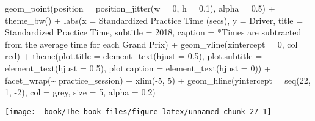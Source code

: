 \documentclass[
]{book}
\newenvironment{Shaded}{\begin{snugshade}}{\end{snugshade}}
\newcommand{\AttributeTok}[1]{\textcolor[rgb]{0.77,0.63,0.00}{#1}}
\newcommand{\DecValTok}[1]{\textcolor[rgb]{0.00,0.00,0.81}{#1}}
\newcommand{\FloatTok}[1]{\textcolor[rgb]{0.00,0.00,0.81}{#1}}
\newcommand{\FunctionTok}[1]{\textcolor[rgb]{0.00,0.00,0.00}{#1}}
\newcommand{\NormalTok}[1]{#1}
\newcommand{\SpecialCharTok}[1]{\textcolor[rgb]{0.00,0.00,0.00}{#1}}
\newcommand{\StringTok}[1]{\textcolor[rgb]{0.31,0.60,0.02}{#1}}
\begin{document}
\begin{Shaded}
\begin{Highlighting}[]
   \FunctionTok{geom\_point}\NormalTok{(}\AttributeTok{position =} \FunctionTok{position\_jitter}\NormalTok{(}\AttributeTok{w =} \DecValTok{0}\NormalTok{, }\AttributeTok{h =} \FloatTok{0.1}\NormalTok{), }\AttributeTok{alpha =} \FloatTok{0.5}\NormalTok{) }\SpecialCharTok{+}
   \FunctionTok{theme\_bw}\NormalTok{() }\SpecialCharTok{+}
   \FunctionTok{labs}\NormalTok{(}\AttributeTok{x =} \StringTok{\textquotesingle{}Standardized Practice Time (secs)\textquotesingle{}}\NormalTok{,}
        \AttributeTok{y =} \StringTok{\textquotesingle{}Driver\textquotesingle{}}\NormalTok{,}
        \AttributeTok{title =} \StringTok{\textquotesingle{}Standardized Practice Time\textquotesingle{}}\NormalTok{,}
        \AttributeTok{subtitle =} \StringTok{\textquotesingle{}2018\textquotesingle{}}\NormalTok{,}
        \AttributeTok{caption =} \StringTok{\textquotesingle{}*Times are subtracted from the average time for each Grand Prix\textquotesingle{}}\NormalTok{) }\SpecialCharTok{+}
   \FunctionTok{geom\_vline}\NormalTok{(}\AttributeTok{xintercept =} \DecValTok{0}\NormalTok{, }\AttributeTok{col =} \StringTok{\textquotesingle{}red\textquotesingle{}}\NormalTok{) }\SpecialCharTok{+}
   \FunctionTok{theme}\NormalTok{(}\AttributeTok{plot.title =} \FunctionTok{element\_text}\NormalTok{(}\AttributeTok{hjust =} \FloatTok{0.5}\NormalTok{),}
         \AttributeTok{plot.subtitle =} \FunctionTok{element\_text}\NormalTok{(}\AttributeTok{hjust =} \FloatTok{0.5}\NormalTok{),}
         \AttributeTok{plot.caption =} \FunctionTok{element\_text}\NormalTok{(}\AttributeTok{hjust =} \DecValTok{0}\NormalTok{)) }\SpecialCharTok{+}
  \FunctionTok{facet\_wrap}\NormalTok{(}\SpecialCharTok{\textasciitilde{}}\NormalTok{ practice\_session) }\SpecialCharTok{+}
  \FunctionTok{xlim}\NormalTok{(}\SpecialCharTok{{-}}\DecValTok{5}\NormalTok{, }\DecValTok{5}\NormalTok{) }\SpecialCharTok{+}
  \FunctionTok{geom\_hline}\NormalTok{(}\AttributeTok{yintercept =} \FunctionTok{seq}\NormalTok{(}\DecValTok{22}\NormalTok{, }\DecValTok{1}\NormalTok{, }\SpecialCharTok{{-}}\DecValTok{2}\NormalTok{), }\AttributeTok{col =} \StringTok{\textquotesingle{}grey\textquotesingle{}}\NormalTok{, }\AttributeTok{size =} \DecValTok{5}\NormalTok{, }\AttributeTok{alpha =}  \FloatTok{0.2}\NormalTok{)}
\end{Highlighting}
\end{Shaded}

\begin{center}\texttt{[image: \_book/The-book\_files/figure-latex/unnamed-chunk-27-1]} \end{center}
\end{document}
